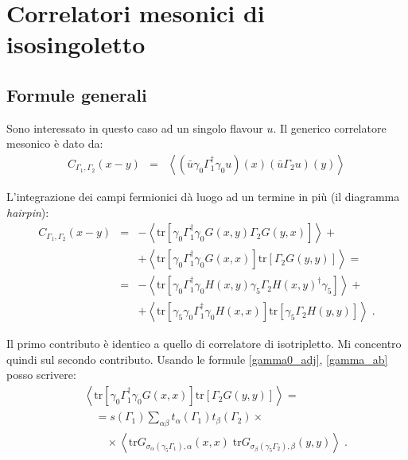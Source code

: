 \documentclass[a4paper]{article}
\newcommand{\tr}{\mathrm{tr}}
\newcommand{\point}{\; .}
\begin{document}
\section{Correlatori mesonici di isosingoletto}

\subsection{Formule generali}

Sono interessato in questo caso ad un singolo flavour $u$. Il generico correlatore mesonico \`{e} dato da:
\begin{eqnarray}
C_{\Gamma_1,\Gamma_2}(x-y) &=& \left<
\left( \bar{u} \gamma_0 \Gamma_1^\dagger \gamma_0 u \right)(x)
\left( \bar{u} \Gamma_2 u \right)(y)
\right>
\end{eqnarray}

L'integrazione dei campi fermionici d\`{a} luogo ad un termine in pi\`{u} (il diagramma \textit{hairpin}):
\begin{eqnarray}
C_{\Gamma_1,\Gamma_2}(x-y) &=&
- \left< \tr
\left[ \gamma_0 \Gamma_1^\dagger \gamma_0 G(x,y) \Gamma_2 G(y,x) \right]
\right> + \nonumber \\
&& + \left< \tr
\left[ \gamma_0 \Gamma_1^\dagger \gamma_0 G(x,x) \right]
\tr \left[ \Gamma_2 G(y,y) \right]
\right>
= \nonumber \\
&=& - \left< \tr
\left[ \gamma_0 \Gamma_1^\dagger \gamma_0 H(x,y) \gamma_5 \Gamma_2 H(x,y)^\dagger \gamma_5 \right]
\right> + \nonumber \\
&& + \left< \tr
\left[ \gamma_5 \gamma_0 \Gamma_1^\dagger \gamma_0 H(x,x) \right]
\tr \left[ \gamma_5 \Gamma_2 H(y,y) \right]
\right>
\point
\end{eqnarray}

Il primo contributo \`{e} identico a quello di correlatore di isotripletto. Mi concentro quindi sul secondo contributo. Usando le formule \ref{gamma0_adj}, \ref{gamma_ab} posso scrivere:
\begin{eqnarray}
&& \left< \tr
\left[ \gamma_0 \Gamma_1^\dagger \gamma_0 G(x,x) \right]
\tr \left[ \Gamma_2 G(y,y) \right] \right> = \nonumber \\
&& \quad = s(\Gamma_1) \sum_{\alpha \beta} t_\alpha(\Gamma_1) t_\beta(\Gamma_2) \times \nonumber \\
&& \qquad \times \left<
\tr G_{\sigma_\alpha(\gamma_5 \Gamma_1),\alpha}(x,x) \;
\tr G_{\sigma_\beta(\gamma_5 \Gamma_2),\beta}(y,y)
\right>
\point \label{hairpin}
\end{eqnarray}
\end{document}
